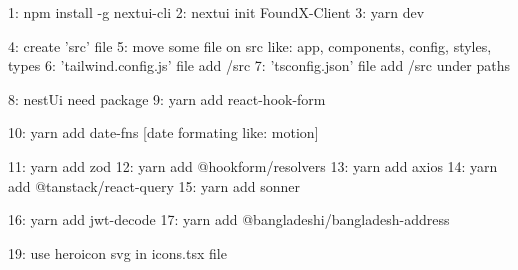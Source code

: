 1: npm install -g nextui-cli
2: nextui init FoundX-Client
3: yarn dev


4: create 'src' file
5: move some file on src like: app, components, config, styles, types
6: 'tailwind.config.js' file add /src
7: 'tsconfig.json' file add /src under paths

8: nestUi need package
9: yarn add react-hook-form

10: yarn add date-fns [date formating like: motion]

11: yarn add zod
12: yarn add @hookform/resolvers
13: yarn add axios
14: yarn add @tanstack/react-query
15: yarn add sonner

16: yarn add jwt-decode
17: yarn add @bangladeshi/bangladesh-address

19: use heroicon svg in icons.tsx file